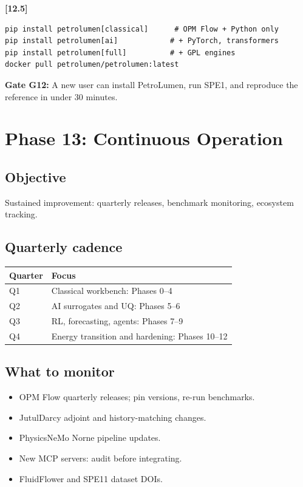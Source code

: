 \documentclass[10pt,a4paper]{article}
\newcommand{\stepID}[1]{\textsf{\textbf{[#1]}}}
\begin{document}
\stepID{12.5}
\begin{lstlisting}[style=sh]
pip install petrolumen[classical]      # OPM Flow + Python only
pip install petrolumen[ai]            # + PyTorch, transformers
pip install petrolumen[full]          # + GPL engines
docker pull petrolumen/petrolumen:latest
\end{lstlisting}

\begin{gate}
\textbf{Gate G12:} A new user can install PetroLumen, run SPE1, and reproduce the reference in under 30 minutes.
\end{gate}

\section{Phase 13: Continuous Operation}
\label{sec:phase13}

\subsection{Objective}
Sustained improvement: quarterly releases, benchmark monitoring, ecosystem tracking.

\subsection{Quarterly cadence}

\begin{longtable}{@{}p{2cm}p{11cm}@{}}
\toprule
Quarter & Focus\\
\midrule
Q1 & Classical workbench: Phases 0--4\\
Q2 & AI surrogates and UQ: Phases 5--6\\
Q3 & RL, forecasting, agents: Phases 7--9\\
Q4 & Energy transition and hardening: Phases 10--12\\
\bottomrule
\end{longtable}

\subsection{What to monitor}

\begin{itemize}[leftmargin=1.4em]
  \item OPM Flow quarterly releases; pin versions, re-run benchmarks.
  \item JutulDarcy adjoint and history-matching changes.
  \item PhysicsNeMo Norne pipeline updates.
  \item New MCP servers: audit before integrating.
  \item FluidFlower and SPE11 dataset DOIs.
\end{itemize}
\end{document}
